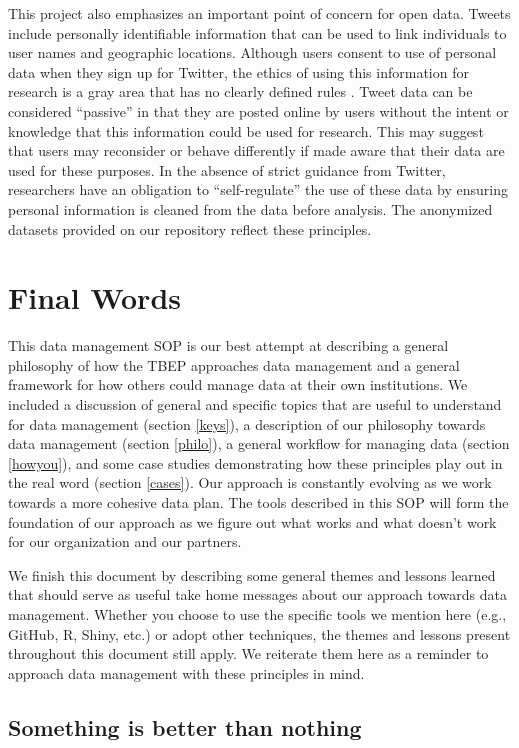\documentclass[
]{book}
\begin{document}
This project also emphasizes an important point of concern for open data. Tweets include personally identifiable information that can be used to link individuals to user names and geographic locations. Although users consent to use of personal data when they sign up for Twitter, the ethics of using this information for research is a gray area that has no clearly defined rules \citep{Zipper19}. Tweet data can be considered ``passive'' in that they are posted online by users without the intent or knowledge that this information could be used for research. This may suggest that users may reconsider or behave differently if made aware that their data are used for these purposes. In the absence of strict guidance from Twitter, researchers have an obligation to ``self-regulate'' the use of these data by ensuring personal information is cleaned from the data before analysis. The anonymized datasets provided on our repository reflect these principles.

\chapter{Final Words}\label{final}

This data management SOP is our best attempt at describing a general philosophy of how the TBEP approaches data management and a general framework for how others could manage data at their own institutions. We included a discussion of general and specific topics that are useful to understand for data management (section \ref{keys}), a description of our philosophy towards data management (section \ref{philo}), a general workflow for managing data (section \ref{howyou}), and some case studies demonstrating how these principles play out in the real word (section \ref{cases}). Our approach is constantly evolving as we work towards a more cohesive data plan. The tools described in this SOP will form the foundation of our approach as we figure out what works and what doesn't work for our organization and our partners.

We finish this document by describing some general themes and lessons learned that should serve as useful take home messages about our approach towards data management. Whether you choose to use the specific tools we mention here (e.g., GitHub, R, Shiny, etc.) or adopt other techniques, the themes and lessons present throughout this document still apply. We reiterate them here as a reminder to approach data management with these principles in mind.

\section{Something is better than nothing}\label{something-is-better-than-nothing}
\end{document}
